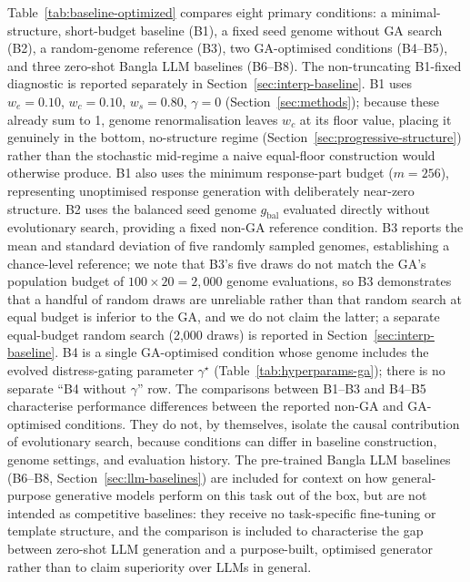 \documentclass[mathematics,article,submit,xetex,moreauthors]{Definitions/mdpi}
\begin{document}
Table~\ref{tab:baseline-optimized} compares eight primary conditions: a
minimal-structure, short-budget baseline (B1), a fixed seed genome without GA
search (B2), a random-genome reference (B3), two GA-optimised conditions
(B4--B5), and three zero-shot Bangla LLM baselines (B6--B8). The
non-truncating B1-fixed diagnostic is reported separately in
Section~\ref{sec:interp-baseline}.
B1 uses $w_e=0.10$,
$w_c=0.10$, $w_s=0.80$, $\gamma=0$ (Section~\ref{sec:methods}); because
these already sum to 1, genome renormalisation leaves $w_c$ at its floor
value, placing it genuinely in the bottom, no-structure regime
(Section~\ref{sec:progressive-structure}) rather than the stochastic
mid-regime a naive equal-floor construction would otherwise produce. B1
also uses the minimum response-part budget ($m=256$), representing
unoptimised response generation with deliberately near-zero structure. B2 uses the balanced seed genome $g_{\mathrm{bal}}$ evaluated directly without
evolutionary search, providing a fixed non-GA reference condition. B3 reports the mean and standard deviation of five
randomly sampled genomes, establishing a chance-level reference; we note
that B3's five draws do not match the GA's population budget of
$100 \times 20 = 2{,}000$ genome evaluations, so B3 demonstrates that a
handful of random draws are unreliable rather than that random search at
equal budget is inferior to the GA, and we do not claim the latter; a
separate equal-budget random search (2,000 draws) is reported in
Section~\ref{sec:interp-baseline}. B4 is a
single GA-optimised condition whose genome includes the evolved distress-gating
parameter $\gamma^{\star}$ (Table~\ref{tab:hyperparams-ga}); there is no
separate ``B4 without $\gamma$'' row. The comparisons between B1--B3 and B4--B5 characterise performance
differences between the reported non-GA and GA-optimised conditions. They do
not, by themselves, isolate the causal contribution of evolutionary search,
because conditions can differ in baseline construction, genome settings, and
evaluation history.
The pre-trained Bangla LLM baselines (B6--B8, Section~\ref{sec:llm-baselines})
are included for context on how general-purpose generative models perform on
this task out of the box, but are not intended as competitive baselines: they
receive no task-specific fine-tuning or template structure, and the comparison
is included to characterise the gap between zero-shot LLM generation and a
purpose-built, optimised generator rather than to claim superiority over
LLMs in general.
\end{document}
